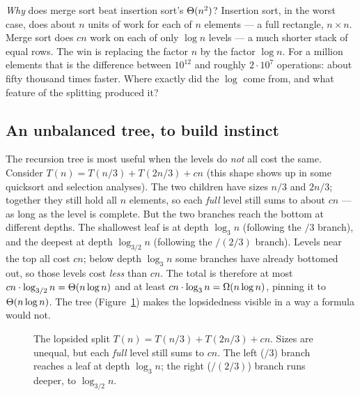 \begin{walkbox}
\emph{Why} does merge sort beat insertion sort's $\Theta(n^2)$?
Insertion sort, in the worst case, does about $n$ units of work for each of $n$
elements --- a full rectangle, $n \times n$. Merge sort does $cn$ work on each of
only $\log n$ levels --- a much shorter stack of equal rows. The win is replacing
the factor $n$ by the factor $\log n$. For a million elements that is the
difference between $10^{12}$ and roughly $2\cdot 10^7$ operations: about fifty
thousand times faster. Where exactly did the $\log$ come from, and what feature of
the splitting produced it?
\end{walkbox}

\subsection{An unbalanced tree, to build instinct}

The recursion tree is most useful when the levels do \emph{not} all cost the same. Consider
$T(n) = T(n/3) + T(2n/3) + cn$ (this shape shows up in some quicksort and
selection analyses). The two children have sizes $n/3$ and $2n/3$; together they
still hold all $n$ elements, so each \emph{full} level still sums to about $cn$ ---
as long as the level is complete. But the two branches reach the bottom at
different depths. The shallowest leaf is at depth $\log_3 n$ (following the
$/3$ branch), and the deepest at depth $\log_{3/2} n$ (following the $/(2/3)$
branch). Levels near the top all cost $cn$; below depth $\log_3 n$ some branches
have already bottomed out, so those levels cost \emph{less} than $cn$. The total
is therefore at most $cn \cdot \log_{3/2} n = \Theta(n \log n)$ and at least
$cn \cdot \log_3 n = \Omega(n \log n)$, pinning it to $\Theta(n\log n)$. The tree
(Figure~\ref{ch04:lopsided}) makes the lopsidedness visible in a way a formula
would not.

\begin{figure}[H]
\centering
{}
\caption{The lopsided split $T(n)=T(n/3)+T(2n/3)+cn$. Sizes are unequal, but each
\emph{full} level still sums to $cn$. The left ($/3$) branch reaches a leaf at
depth $\log_3 n$; the right ($/(2/3)$) branch runs deeper, to $\log_{3/2} n$.}
\label{ch04:lopsided}
\end{figure}

